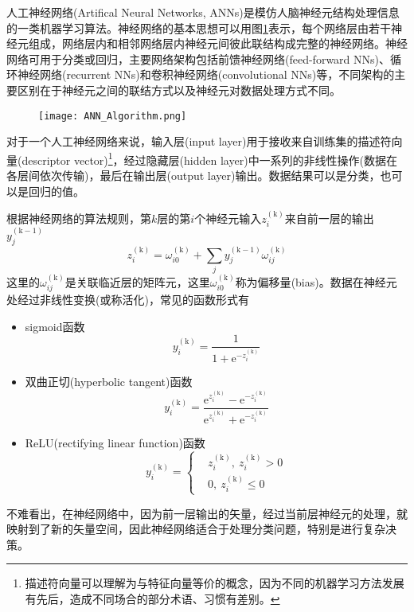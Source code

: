 人工神经网络\textrm{(Artifical Neural Networks, ANNs)}是模仿人脑神经元结构处理信息的一类机器学习算法。神经网络的基本思想可以用图\ref{ML_ANN}表示，每个网络层由若干神经元组成，网络层内和相邻网络层内神经元间彼此联结构成完整的神经网络。神经网络可用于分类或回归，主要网络架构包括前馈神经网络\textrm{(feed-forward NNs)}、循环神经网络\textrm{(recurrent NNs)}和卷积神经网络\textrm{(convolutional NNs)}等，不同架构的主要区别在于神经元之间的联结方式以及神经元对数据处理方式不同。
\begin{figure}[h!]
\centering
\vspace*{-0.1in}
\texttt{[image: ANN\_Algorithm.png]}
\caption{\fontsize{7.2pt}{4.2pt}\selectfont{含有多个隐藏层的人工神经网络的基本示意图.}}%
\label{ML_ANN}
\end{figure}

对于一个人工神经网络来说，输入层\textrm{(input layer)}用于接收来自训练集的描述符向量(\textrm{descriptor vector})\footnote{描述符向量可以理解为与特征向量等价的概念，因为不同的机器学习方法发展有先后，造成不同场合的部分术语、习惯有差别。}，经过隐藏层\textrm{(hidden layer)}中一系列的非线性操作(数据在各层间依次传输)，最后在输出层\textrm{(output layer)}输出。数据结果可以是分类，也可以是回归的值。

根据神经网络的算法规则，第$k$层的第$i$个神经元输入$z_i^{(\mathrm{k})}$来自前一层的输出$y_j^{(\mathrm{k-1})}$
\begin{displaymath}
	z_i^{(\mathrm{k})}=\omega_{i0}^{(\mathrm{k})}+\sum_jy_j^{(\mathrm{k-1})}\omega_{ij}^{(\mathrm{k})}
\end{displaymath}
这里的$\omega_{ij}^{(\mathrm{k})}$是关联临近层的矩阵元，这里$\omega_{i0}^{(\mathrm{k})}$称为偏移量\textrm{(bias)}。数据在神经元处经过非线性变换(或称活化)，常见的函数形式有
\begin{itemize}
	\item \textrm{sigmoid}函数
\begin{displaymath}
	y_i^{(\mathrm{k})}=\dfrac1{1+\mathrm{e}^{-z_i^{(\mathrm{k})}}}
\end{displaymath}
\item 双曲正切\textrm{(hyperbolic tangent)}函数
\begin{displaymath}
	y_i^{(\mathrm{k})}=\dfrac{\mathrm{e}^{z_i^{(\mathrm{k})}}-\mathrm{e}^{-z_i^{(\mathrm{k})}}}{\mathrm{e}^{z_i^{(\mathrm{k})}}+\mathrm{e}^{-z_i^{(\mathrm{k})}}}
\end{displaymath}
\item \textrm{ReLU(rectifying linear function)}函数
	\begin{displaymath}
		y_i^{(\mathrm{k})}=\left\{
			\begin{aligned}
			& z_i^{(\mathrm{k})},~z_i^{(\mathrm{k})}>0\\
& 0,~z_i^{(\mathrm{k})}\leqslant0 
			\end{aligned}
\right.
	\end{displaymath}
\end{itemize}
不难看出，在神经网络中，因为前一层输出的矢量，经过当前层神经元的处理，就映射到了新的矢量空间，因此神经网络适合于处理分类问题，特别是进行复杂决策。


